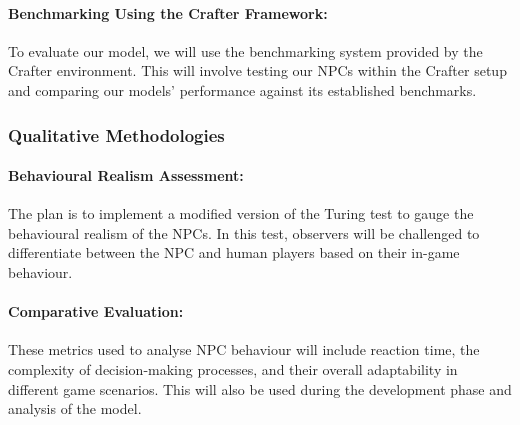 \documentclass{article}
\begin{document}
\paragraph{Benchmarking Using the Crafter Framework:}
To evaluate our model, we will use the benchmarking system provided by the Crafter environment. This will involve testing our NPCs within the Crafter setup and comparing our models' performance against its established benchmarks. \cite{Crafter}

\subsubsection{Qualitative Methodologies}

\paragraph{Behavioural Realism Assessment:}
The plan is to implement a modified version of the Turing test to gauge the behavioural realism of the NPCs. In this test, observers will be challenged to differentiate between the NPC and human players based on their in-game behaviour. \cite{Turing_Navigation}

\paragraph{Comparative Evaluation:}
These metrics used to analyse NPC behaviour will include reaction time, the complexity of decision-making processes, and their overall adaptability in different game scenarios. This will also be used during the development phase and analysis of the model.




\end{document}

